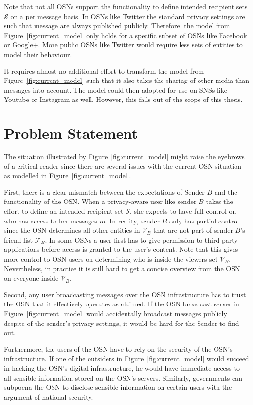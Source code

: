 Note that not all OSNs support the functionality to define intended recipient sets $\mathcal{S}$ on a per message basis. In OSNs like Twitter the standard privacy settings are such that message are always published publicly. Therefore, the model from Figure~\ref{fig:current_model} only holds for a specific subset of OSNs like Facebook or Google+. More public OSNs like Twitter would require less sets of entities to model their behaviour.

It requires almost no additional effort to transform the model from Figure~\ref{fig:current_model} such that it also takes the sharing of other media than messages into account. The model could then adopted for use on SNSs like Youtube or Instagram as well. However, this falls out of the scope of this thesis.

\section{Problem Statement}
\label{sec:problem_statement}
The situation illustrated by Figure~\ref{fig:current_model} might raise the eyebrows of a critical reader since there are several issues with the current OSN situation as modelled in Figure~\ref{fig:current_model}.

First, there is a clear mismatch between the expectations of Sender $B$ and the functionality of the OSN. When a privacy-aware user like sender $B$ takes the effort to define an intended recipient set $\mathcal{S}$, she expects to have full control on who has access to her messages $m$. In reality, sender $B$ only has partial control since the OSN determines all other entities in $\mathcal{V}_B$ that are not part of sender $B$'s friend list $\mathcal{F}_B$. In some OSNs a user first has to give permission to third party applications before access is granted to the user's content. Note that this gives more control to OSN users on determining who is inside the viewers set $\mathcal{V}_B$. Nevertheless, in practice it is still hard to get a concise overview from the OSN on everyone inside $\mathcal{V}_B$.

Second, any user broadcasting messages over the OSN infrastructure has to trust the OSN that it effectively operates as claimed. If the OSN broadcast server in Figure~\ref{fig:current_model} would accidentally broadcast messages publicly despite of the sender's privacy settings, it would be hard for the Sender to find out.

Furthermore, the users of the OSN have to rely on the security of the OSN's infrastructure. If one of the outsiders in Figure~\ref{fig:current_model} would succeed in hacking the OSN's digital infrastructure, he would have immediate access to all sensible information stored on the OSN's servers. Similarly, governments can subpoena the OSN to disclose sensible information on certain users with the argument of national security.

